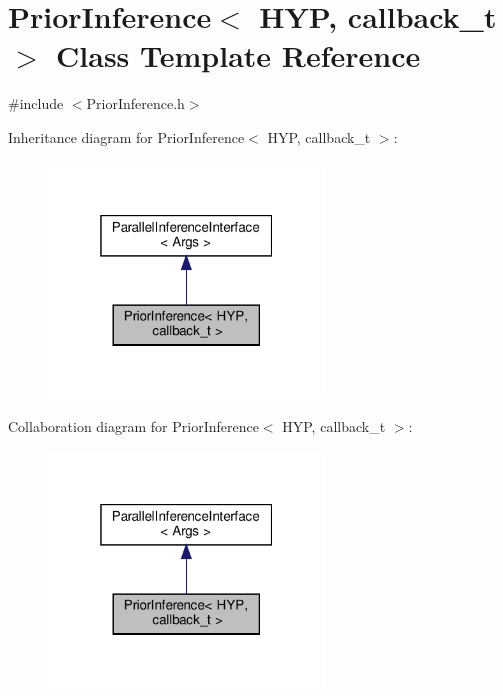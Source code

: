 \hypertarget{class_prior_inference}{}\section{Prior\+Inference$<$ H\+YP, callback\+\_\+t $>$ Class Template Reference}
\label{class_prior_inference}


{\ttfamily \#include $<$Prior\+Inference.\+h$>$}



Inheritance diagram for Prior\+Inference$<$ H\+YP, callback\+\_\+t $>$\+:\nopagebreak
\begin{figure}[H]
\begin{center}
\leavevmode
\includegraphics[width=208pt]{class_prior_inference__inherit__graph}
\end{center}
\end{figure}


Collaboration diagram for Prior\+Inference$<$ H\+YP, callback\+\_\+t $>$\+:\nopagebreak
\begin{figure}[H]
\begin{center}
\leavevmode
\includegraphics[width=208pt]{class_prior_inference__coll__graph}
\end{center}
\end{figure}
